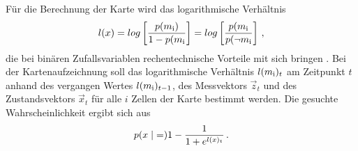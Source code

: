 Für die Berechnung der Karte wird das logarithmische Verhältnis
\begin{equation}
l(x) = log\left[ \frac{p(m_{\text{i}})}{1-p(m_{\text{i}}} \right] = log\left[ \frac{p(m_{\text{i}}}{p(\neg m_{\text{i}}} \right]\,,
\end{equation}
die bei binären Zufallsvariablen  rechentechnische Vorteile mit sich bringen  \cite[S. 94 f]{ProbRob}. Bei der Kartenaufzeichnung soll das logarithmische Verhältnis $l(m_{\text{i}})_t$ am Zeitpunkt $t$ anhand des vergangen Wertes $l(m_{\text{i}})_{t-1}$, des Messvektors $\vec{z}_t$ und des Zustandsvektors $\vec{x}_t$ für alle $i$ Zellen der Karte bestimmt werden. Die gesuchte Wahrscheinlichkeit ergibt sich aus
\begin{equation}
p({x} \hspace{1mm} \vert \hspace{1mm} {=}) 1 - \frac{1}{1+e^{l(x)_t}}\,.
\end{equation}

